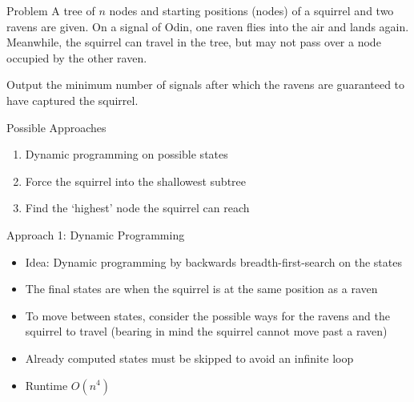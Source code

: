 \begin{slide}
    \begin{block}{Problem}
        A tree of $n$ nodes and starting positions (nodes) of a squirrel and two ravens are given. On a signal of Odin, one raven flies into the air and lands again. Meanwhile, the squirrel can travel in the tree, but may not pass over a node occupied by the other raven.
        
        Output the minimum number of signals after which the ravens are guaranteed to have captured the squirrel.
    \end{block}
    \begin{block}{Possible Approaches}
        \begin{enumerate}
        \item Dynamic programming on possible states
        \item Force the squirrel into the shallowest subtree
        \item Find the `highest' node the squirrel can reach
        \end{enumerate}
    \end{block}
\end{slide}

\begin{slide}
%        
    \begin{block}{Approach 1: Dynamic Programming}
        \begin{itemize}
        \item Idea: Dynamic programming by backwards breadth-first-search on the states
        \item The final states are when the squirrel is at the same position as a raven
        \item To move between states, consider the possible ways for the ravens and the squirrel to travel (bearing in mind the squirrel cannot move past a raven)
        \item Already computed states must be skipped to avoid an infinite loop
        \item Runtime $O(n^4)$
        \end{itemize}
    \end{block}
\end{slide}

